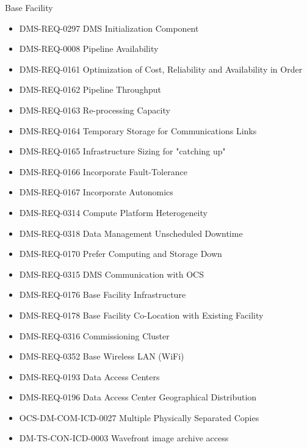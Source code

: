 Base Facility \begin{itemize}
\item DMS-REQ-0297 DMS Initialization Component
\item DMS-REQ-0008 Pipeline Availability
\item DMS-REQ-0161 Optimization of Cost, Reliability and Availability in Order
\item DMS-REQ-0162 Pipeline Throughput
\item DMS-REQ-0163 Re-processing Capacity
\item DMS-REQ-0164 Temporary Storage for Communications Links
\item DMS-REQ-0165 Infrastructure Sizing for "catching up"
\item DMS-REQ-0166 Incorporate Fault-Tolerance
\item DMS-REQ-0167 Incorporate Autonomics
\item DMS-REQ-0314 Compute Platform Heterogeneity
\item DMS-REQ-0318 Data Management Unscheduled Downtime
\item DMS-REQ-0170 Prefer Computing and Storage Down
\item DMS-REQ-0315 DMS Communication with OCS
\item DMS-REQ-0176 Base Facility Infrastructure
\item DMS-REQ-0178 Base Facility Co-Location with Existing Facility
\item DMS-REQ-0316 Commissioning Cluster
\item DMS-REQ-0352 Base Wireless LAN (WiFi)
\item DMS-REQ-0193 Data Access Centers
\item DMS-REQ-0196 Data Access Center Geographical Distribution
\item OCS-DM-COM-ICD-0027 Multiple Physically Separated Copies
\item DM-TS-CON-ICD-0003 Wavefront image archive access
\end{itemize}
